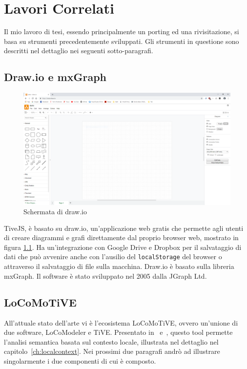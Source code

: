 ﻿\chapter{Lavori Correlati}
    Il mio lavoro di tesi, essendo principalmente un porting ed una rivisitazione, si basa su strumenti precedentemente sviluppati.
    Gli strumenti in questione sono descritti nel dettaglio nei seguenti sotto-paragrafi.

    \section{Draw.io e mxGraph}

        \begin{figure}[htbp]
            \centering
            \includegraphics[scale=0.17]{Figure/drawio.png}
            \caption{Schermata di draw.io}
            \label{fig:drawio}
        \end{figure}

        TiveJS, è basato su draw.io, un'applicazione web gratis che permette agli utenti di creare diagrammi e grafi direttamente dal proprio browser web, mostrato in figura \ref{fig:drawio}. Ha un'integrazione con Google Drive e Dropbox per il salvataggio di dati che può avvenire anche con l'ausilio del \texttt{localStorage} del browser o attraverso il salvataggio di file sulla macchina. Draw.io è basato sulla libreria mxGraph. Il software è stato sviluppato nel 2005 dalla JGraph Ltd.

    \section{LoCoMoTiVE}
        
        All'attuale stato dell'arte vi è l'ecosistema LoCoMoTiVE, ovvero un'unione di due software, LoCoModeler e TiVE. Presentato in~\cite{extending_localcontext} e~\cite{localcontext}, questo tool permette l'analisi semantica basata sul contesto locale, illustrata nel dettaglio nel capitolo~\ref{ch:localcontext}. Nei prossimi due paragrafi andrò ad illustrare singolarmente i due componenti di cui è composto.

